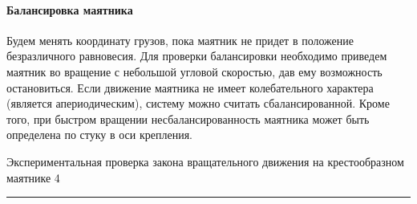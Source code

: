 \documentclass[12pt,a4paper]{scrartcl}
\begin{document}
	\paragraph{Балансировка маятника} \hfill
	
	\par Будем менять координату грузов, пока маятник не придет в положение безразличного равновесия. Для проверки балансировки необходимо приведем маятник во вращение с небольшой угловой скоростью, дав ему возможность остановиться. Если движение маятника не имеет колебательного характера (является апериодическим), систему можно считать сбалансированной. Кроме того, при быстром вращении несбалансированность маятника может
	быть определена по стуку в оси крепления.
	
	
	\newpage
	
	\begin{flushleft}
		\footnotesize{Экспериментальная проверка закона вращательного движения на крестообразном маятнике} \hspace{\fill} \footnotesize{4}
		\\[-0.3cm]\noindent\rule{\textwidth}{0.3pt}
	\end{flushleft}
\end{document}
